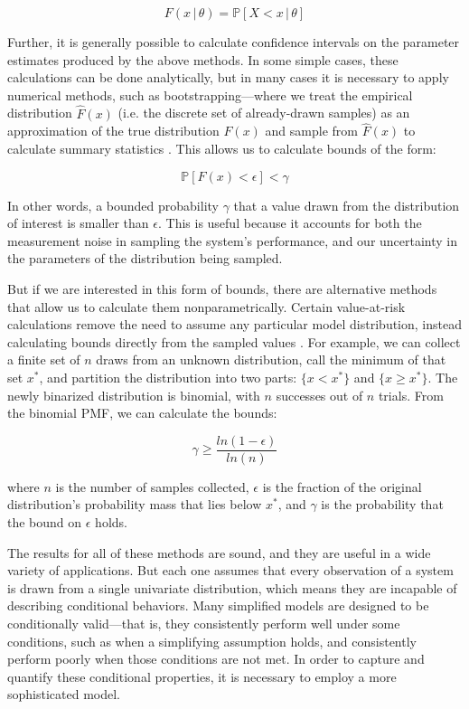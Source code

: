 \documentclass[12pt, conference]{IEEEtran}
\begin{document}
\begin{equation}
    F(x\,|\,\theta) = \mathbb{P}[X<x\,|\,\theta] \nonumber
\end{equation}

Further, it is generally possible to calculate confidence intervals on the parameter estimates produced by the above methods. In some simple cases, these calculations can be done analytically, but in many cases it is necessary to apply numerical methods, such as bootstrapping---where we treat the empirical distribution $\hat{F}(x)$ (i.e. the discrete set of already-drawn samples) as an approximation of the true distribution $F(x)$ and sample from $\hat{F}(x)$ to calculate summary statistics \cite{efron94}. This allows us to calculate bounds of the form:

\begin{equation}
    \mathbb{P}[F(x)<\epsilon]<\gamma \nonumber
\end{equation}

In other words, a bounded probability $\gamma$ that a value drawn from the distribution of interest is smaller than $\epsilon$. This is useful because it accounts for both the measurement noise in sampling the system's performance, and our uncertainty in the parameters of the distribution being sampled.

But if we are interested in this form of bounds, there are alternative methods that allow us to calculate them nonparametrically. Certain value-at-risk calculations remove the need to assume any particular model distribution, instead calculating bounds directly from the sampled values \cite{jorion06,kuester06}. For example, we can collect a finite set of $n$ draws from an unknown distribution, call the minimum of that set $x^*$, and partition the distribution into two parts: $\{x<x^*\}$ and $\{x\geq x^*\}$. The newly binarized distribution is binomial, with $n$ successes out of $n$ trials. From the binomial PMF, we can calculate the bounds:

\begin{equation}
    \gamma \geq \frac{ln(1-\epsilon)}{ln(n)} \nonumber
\end{equation}

where $n$ is the number of samples collected, $\epsilon$ is the fraction of the original distribution's probability mass that lies below $x^*$, and $\gamma$ is the probability that the bound on $\epsilon$ holds.

The results for all of these methods are sound, and they are useful in a wide variety of applications. But each one assumes that every observation of a system is drawn from a single univariate distribution, which means they are incapable of describing conditional behaviors. Many simplified models are designed to be conditionally valid---that is, they consistently perform well under some conditions, such as when a simplifying assumption holds, and consistently perform poorly when those conditions are not met. In order to capture and quantify these conditional properties, it is necessary to employ a more sophisticated model.
\newline
\end{document}
